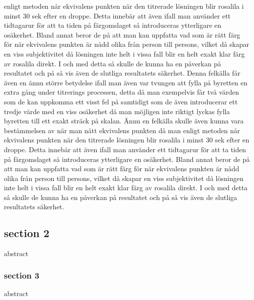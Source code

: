 enligt metoden når ekvivalens punkten när den titrerade lösningen blir rosalila i minst 30 sek efter en
droppe. Detta innebär att även ifall man använder ett tidtagarur för att ta tiden på färgomslaget så
introduceras ytterligare en osäkerhet. Bland annat beror de på att man kan uppfatta vad som är rätt
färg för när ekvivalens punkten är nådd olika från person till persons, vilket då skapar en viss
subjektivitet då lösningen inte helt i vissa fall blir en helt exakt klar färg av rosalila direkt. I och med
detta så skulle de kunna ha en påverkan på resultatet och på så vis även de slutliga
resultatets säkerhet. Denna felkälla får även en ännu större betydelse ifall man även var tvungen att fylla på
byretten en extra gång under titrerings processen, detta då man exempelvis får två värden som de kan
uppkomma ett visst fel på samtidigt som de även introducerar ett tredje värde med en viss osäkerhet
då man möjligen inte riktigt lyckas fylla byretten till ett exakt sträck på skalan.
Ännu en felkälla skulle även kunna vara bestämmelsen av när man nått ekvivalens punkten då man
enligt metoden når ekvivalens punkten när den titrerade lösningen blir rosalila i minst 30 sek efter en
droppe. Detta innebär att även ifall man använder ett tidtagarur för att ta tiden på färgomslaget så
introduceras ytterligare en osäkerhet. Bland annat beror de på att man kan uppfatta vad som är rätt
färg för när ekvivalens punkten är nådd olika från person till persons, vilket då skapar en viss
subjektivitet då lösningen inte helt i vissa fall blir en helt exakt klar färg av rosalila direkt. I och med
detta så skulle de kunna ha en påverkan på resultatet och på så vis även de slutliga
resultatets säkerhet.

\subsection{section 2}
abstract
\subsubsection{section 3}
abstract